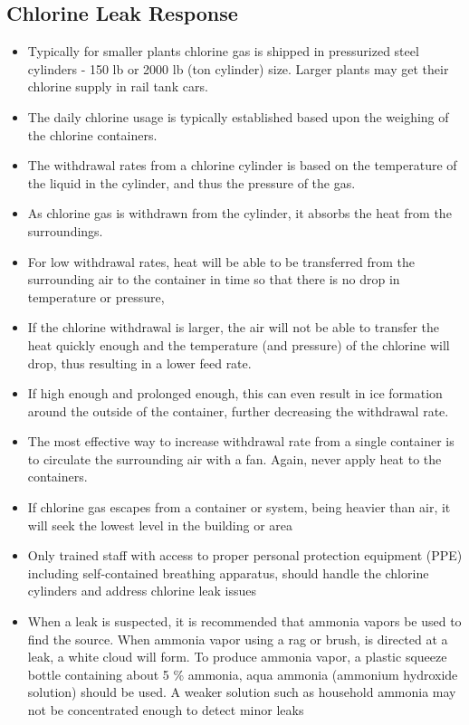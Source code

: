 \subsection{Chlorine Leak Response}
\begin{itemize}
	\item Typically for smaller plants chlorine gas is shipped in  pressurized steel cylinders - 150 lb or 2000 lb (ton cylinder) size.  Larger plants may get their chlorine supply in rail tank cars.  
	\item The daily chlorine usage is typically established based upon the weighing of the chlorine containers.
	\item The withdrawal rates from a chlorine cylinder is based on the temperature of the liquid in the cylinder, and thus the pressure of the gas. 
	\item As chlorine gas is withdrawn from the cylinder, it absorbs the heat from the surroundings.
	\item For low withdrawal rates, heat will be able to be transferred from the surrounding air to the container in time so that there is no drop in temperature or pressure, 
	\item If the chlorine withdrawal is larger, the air will not be able to transfer the heat quickly enough and the temperature (and pressure) of the chlorine will drop, thus resulting in a lower feed rate. 
	\item If high enough and prolonged enough, this can even result in ice formation around the outside of the container, further decreasing the withdrawal rate. 
	\item The most effective way to increase withdrawal rate from a single container is to circulate the surrounding air with a fan. Again, never apply heat to the containers.
	\item If chlorine gas escapes from a container or system, being heavier than air, it will seek the lowest level in the building or area
	\item Only trained staff with access to proper personal protection equipment (PPE) including self-contained breathing apparatus, should handle the chlorine cylinders and address chlorine leak issues 
	\item When a leak is suspected, it is recommended that ammonia vapors be used to find the source. When ammonia vapor using a rag or brush, is directed at a leak, a white cloud will form. To produce ammonia vapor, a plastic squeeze bottle containing about 5 \% ammonia, aqua ammonia (ammonium hydroxide solution) should be used. A weaker solution such as household ammonia may not be concentrated enough to detect minor leaks

\end{itemize}
